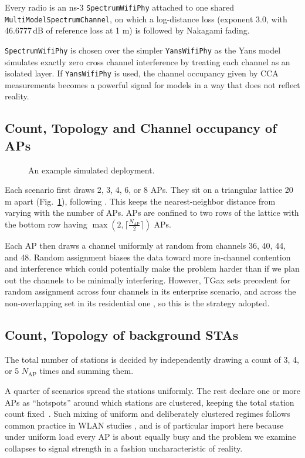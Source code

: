\documentclass[conference]{IEEEtran}
\newcommand{\code}[1]{\texttt{\small #1}}
\begin{document}
Every radio is an ns-3 \code{SpectrumWifiPhy} attached to one shared
\code{MultiModelSpectrumChannel}, on which a log-distance loss (exponent 3.0,
with 46.6777\,dB of reference loss at 1 m) is followed by Nakagami fading.

\code{SpectrumWifiPhy} is chosen over the simpler \code{YansWifiPhy} as the Yans model 
simulates exactly zero cross channel interference by treating each channel as 
an isolated layer. If \code{YansWifiPhy} is used, the channel occupancy given by CCA 
measurements becomes a powerful signal for models in a way that does not reflect reality.

\subsection{Count, Topology and Channel occupancy of APs}


\begin{figure}[!ht]
  \centering
  
  \caption{An example simulated deployment.}
  \label{fig:deployment}
\end{figure}

Each scenario first draws 2, 3, 4, 6, or 8 APs. They sit on a triangular
lattice 20 m apart (Fig.~\ref{fig:deployment}), following \cite{tgax2016scenarios}. This keeps the nearest-neighbor 
distance from varying with the number of APs. APs are confined to two rows of the lattice 
with the bottom row having $\max(2, \lceil\frac{N_{\mathrm{AP}}}{2}\rceil)$ APs. 

Each AP then draws a channel uniformly at random from channels 
36, 40, 44, and 48. Random assignment biases the data toward more in-channel 
contention and interference which could potentially make the problem harder than if 
we plan out the channels to be minimally interfering. However, TGax sets precedent
for random assignment across four channels in its enterprise scenario, and across 
the non-overlapping set in its residential one \cite{tgax2016scenarios}, 
so this is the strategy adopted.

\subsection{Count, Topology of background STAs}

The total number of stations is decided by independently drawing a count of 3, 4, or 5 
$N_{\mathrm{AP}}$ times and summing them.

A quarter of scenarios spread the stations uniformly. 
The rest declare one or more APs as ``hotspots'' around which stations are clustered, keeping the total station count fixed~\cite{3gpp36814}.
Such mixing of uniform and deliberately clustered regimes follows common practice in WLAN studies
\cite{wong2018daga,zhang2020placement}, and is of particular import here because under uniform
load every AP is about equally busy and the problem we examine collapses to signal
strength in a fashion uncharacteristic of reality.
\end{document}
